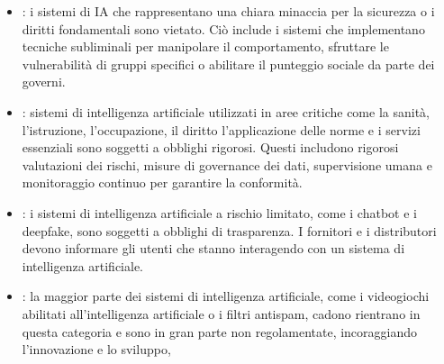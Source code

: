 \begin{itemize}
  \item {}: i sistemi di IA che rappresentano una chiara minaccia per la sicurezza o i diritti fondamentali sono vietato. Ciò include i sistemi che implementano tecniche subliminali per manipolare il comportamento, sfruttare le vulnerabilità di gruppi specifici o abilitare il punteggio sociale da parte dei governi.
  \item  {}: sistemi di intelligenza artificiale utilizzati in aree critiche come la sanità, l'istruzione, l'occupazione, il diritto l'applicazione delle norme e i servizi essenziali sono soggetti a obblighi rigorosi. Questi includono rigorosi valutazioni dei rischi, misure di governance dei dati, supervisione umana e monitoraggio continuo per garantire la conformità. 
  \item {}: i sistemi di intelligenza artificiale a rischio limitato, come i chatbot e i deepfake, sono soggetti a obblighi di trasparenza. I fornitori e i distributori devono informare gli utenti che stanno interagendo con un sistema di intelligenza artificiale. 
  \item {}: la maggior parte dei sistemi di intelligenza artificiale, come i videogiochi abilitati all'intelligenza artificiale o i filtri antispam, cadono rientrano in questa categoria e sono in gran parte non regolamentate, incoraggiando l'innovazione e lo sviluppo,
\end{itemize}



